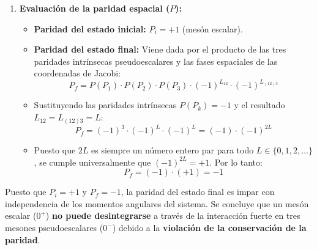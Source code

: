 \begin{problema}
\begin{enumerate}[label=\arabic*.]
    Dado que los tres mesones producidos tienen espín nulo ($J_1 = J_2 = J_3 = 0$), el momento angular total final es la combinación de los dos momentos angulares orbitales relativos:
    \begin{equation*}
        \vec{J}_f = \vec{L}_{12} \otimes \vec{L}_{(12)3}
    \end{equation*}

    Imponiendo la conservación del momento angular total con $J_i = 0$:
    \begin{equation*}
        \vec{J}_f = \vec{L}_{12} \otimes \vec{L}_{(12)3} = 0 \implies L_{12} = L_{(12)3} \equiv L
    \end{equation*}
    Ambos momentos angulares orbitales deben ser idénticos ($L_{12} = L_{(12)3} = L$).

    \item \textbf{Evaluación de la paridad espacial ($P$):}
    \begin{itemize}
        \item \textbf{Paridad del estado inicial:} $P_i = +1$ (mesón escalar).
        \item \textbf{Paridad del estado final:} Viene dada por el producto de las tres paridades intrínsecas pseudoescalares y las fases espaciales de las coordenadas de Jacobi:
        \begin{equation*}
            P_f = P(P_1) \cdot P(P_2) \cdot P(P_3) \cdot (-1)^{L_{12}} \cdot (-1)^{L_{(12)3}}
        \end{equation*}
        \item Sustituyendo las paridades intrínsecas $P(P_k) = -1$ y el resultado $L_{12} = L_{(12)3} = L$:
        \begin{equation*}
            P_f = (-1)^3 \cdot (-1)^L \cdot (-1)^L = (-1) \cdot (-1)^{2L}
        \end{equation*}
        \item Puesto que $2L$ es siempre un número entero par para todo $L \in \{0, 1, 2, \dots\}$, se cumple universalmente que $(-1)^{2L} = +1$. Por lo tanto:
        \begin{equation*}
            P_f = (-1) \cdot (+1) = -1
        \end{equation*}
    \end{itemize}
\end{enumerate}

Puesto que $P_i = +1$ y $P_f = -1$, la paridad del estado final es impar con independencia de los momentos angulares del sistema. Se concluye que un mesón escalar ($0^+$) \textbf{no puede desintegrarse} a través de la interacción fuerte en tres mesones pseudoescalares ($0^-$) debido a la \textbf{violación de la conservación de la paridad}.
\end{problema}


